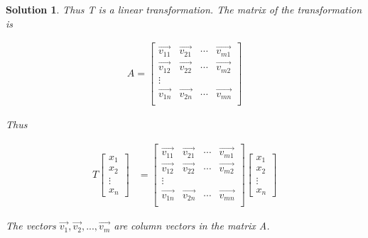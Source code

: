 \documentclass{article}
\newtheorem*{solution}{Solution}
\begin{document}
\begin{solution}
Thus T is a linear transformation. The matrix of the transformation is

\begin{align*}
A = \begin{bmatrix}
\vec{v_{11}} & \vec{v_{21}} & \cdots & \vec{v_{m1}} \\
\vec{v_{12}} & \vec{v_{22}} & \cdots & \vec{v_{m2}} \\
\vdots \\
\vec{v_{1n}} & \vec{v_{2n}} & \cdots & \vec{v_{mn}} \\
\end{bmatrix}
\end{align*}

Thus 

\begin{align*}
T \begin{bmatrix} x_{1} \\ x_{2} \\ \vdots \\ x_{n} \end{bmatrix} &= \begin{bmatrix}
\vec{v_{11}} & \vec{v_{21}} & \cdots & \vec{v_{m1}} \\
\vec{v_{12}} & \vec{v_{22}} & \cdots & \vec{v_{m2}} \\
\vdots \\
\vec{v_{1n}} & \vec{v_{2n}} & \cdots & \vec{v_{mn}} \\
\end{bmatrix} 
\begin{bmatrix} x_{1} \\ x_{2} \\ \vdots \\ x_{n} \end{bmatrix}
\end{align*}

The vectors $\vec{v_{1}}, \vec{v_{2}}, ..., \vec{v_{m}}$ are column vectors in the matrix A.
\end{solution}
\end{document}
